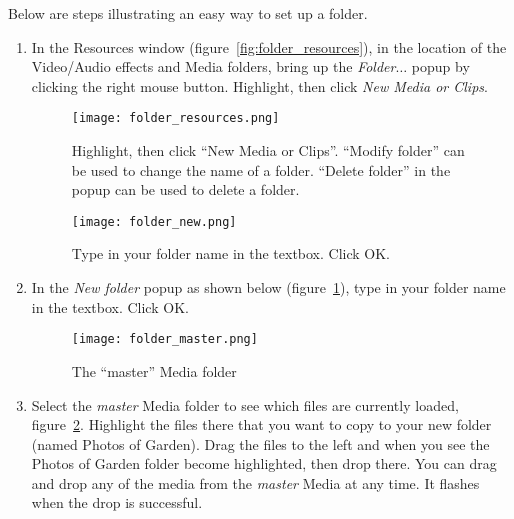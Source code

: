 Below are steps illustrating an easy way to set up a folder.

\begin{enumerate}
    \item In the Resources window (figure~\ref{fig:folder_resources}), in the location of the Video/Audio effects and Media folders, bring up the \textit{Folder}$\dots$ popup by clicking the right mouse button.  
        Highlight, then click \textit{New Media or Clips}.
        \begin{figure}[htpb]
            \begin{minipage}{.6\linewidth}
                \centering
                \texttt{[image: folder\_resources.png]}
                \caption{Highlight, then click “New Media or Clips”.
                    “Modify folder” can be used to   change the name of a folder.
                    “Delete folder” in the popup can be used to delete a folder.
                }
                \label{fig:folder_resources}
            \end{minipage}
            \hfill
            \begin{minipage}{.37\linewidth}
                \centering
                \vspace{18ex}

                \texttt{[image: folder\_new.png]}
                \caption{Type in your folder name in the textbox.  Click OK.}
                \label{fig:folder_new}
            \end{minipage}
        \end{figure}
    \item  In the \textit{New folder} popup as shown below (figure~\ref{fig:folder_new}), type in your folder name in the textbox.  Click OK.
     \begin{figure}[htbp]    
     	\centering
     	\texttt{[image: folder\_master.png]}
     	\caption{The “master” Media folder}
     	\label{fig:folder_master}
     \end{figure}     
    \item  Select the \textit{master} Media folder to see which files are currently loaded, figure~\ref{fig:folder_master}.  
        Highlight the files there that you want to copy to your new folder (named Photos of Garden).  
        Drag the files to the left and when you see the Photos of Garden folder become highlighted, then drop there.  
        You can drag and drop any of the media from the \textit{master} Media at any time.  
        It flashes when the drop is successful.
\end{enumerate}

